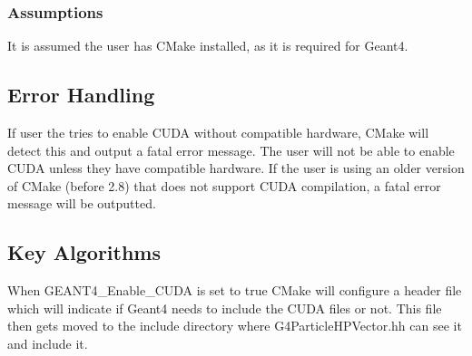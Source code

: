 \documentclass[12pt]{article}
\begin{document}
\subsubsection{Assumptions}%
It is assumed the user has CMake installed, as it is required for Geant4.

\subsection{Error Handling}
If user the tries to enable CUDA without compatible hardware, CMake will detect this and output a fatal error message. The user will not be able to enable CUDA unless they have compatible hardware. If the user is using an older version of CMake (before 2.8) that does not support CUDA compilation, a fatal error message will be outputted.

\subsection{Key Algorithms}
When GEANT4\_Enable\_CUDA is set to true CMake will configure a header file which will indicate if Geant4 needs to include the CUDA files or not. This file then gets moved to the include directory where G4ParticleHPVector.hh can see it and include it.

\end{document}
